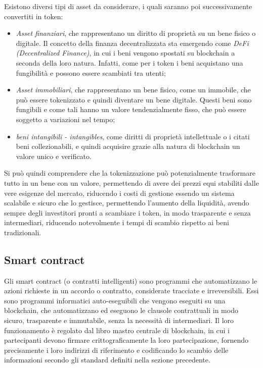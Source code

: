 Esistono diversi tipi di asset da considerare, i quali saranno poi successivamente convertiti in token:
\begin{itemize}
    \item{\textit{Asset finanziari}}, che rappresentano un diritto di proprietà su un bene fisico o digitale. Il concetto della finanza decentralizzata sta emergendo come \textit{DeFi (Decentralized Finance)},
    in cui i beni vengono spostati su blockchain a seconda della loro natura. Infatti, come per i token i beni acquistano una fungibilità e possono essere scambiati tra utenti;
    \item{\textit{Asset immobiliari}}, che rappresentano un bene fisico, come un immobile, che può essere tokenizzato e quindi diventare un bene digitale. 
    Questi beni sono fungibili e come tali hanno un valore tendenzialmente fisso, che può essere soggetto a variazioni nel tempo;
    \item{\textit{beni intangibili - intangibles}}, come diritti di proprietà intellettuale o i citati beni collezionabili,
    e quindi acquisire grazie alla natura di blockchain un valore unico e verificato.
\end{itemize} 

Si può quindi comprendere che la tokenizzazione può potenzialmente trasformare tutto in un bene con un valore, permettendo di avere dei prezzi equi stabiliti dalle vere esigenze del mercato,
riducendo i costi di gestione essendo un sistema scalabile e sicuro che lo gestisce, permettendo l'aumento della liquidità, avendo sempre degli investitori pronti a scambiare i token, in modo trasparente
e senza intermediari, riducendo notevolmente i tempi di scambio rispetto ai beni tradizionali.

\subsection{Smart contract}\label{sec:tecnologie-blockchain-avanziate-smart-contract}
Gli smart contract (o contratti intelligenti) sono programmi che automatizzano le azioni richieste in un accordo o contratto, considerate tracciate e irreversibili. 
Essi sono programmi informatici auto-eseguibili che vengono eseguiti su una blockchain, che automatizzano ed eseguono le clausole contrattuali in modo sicuro, trasparente e immutabile, senza la necessità di intermediari.
Il loro funzionamento è regolato dal libro mastro centrale di blockchain, in cui i partecipanti devono firmare crittograficamente la loro partecipazione, fornendo precisamente i loro indirizzi di riferimento 
e codificando lo scambio delle informazioni secondo gli standard definiti nella sezione precedente. \\

